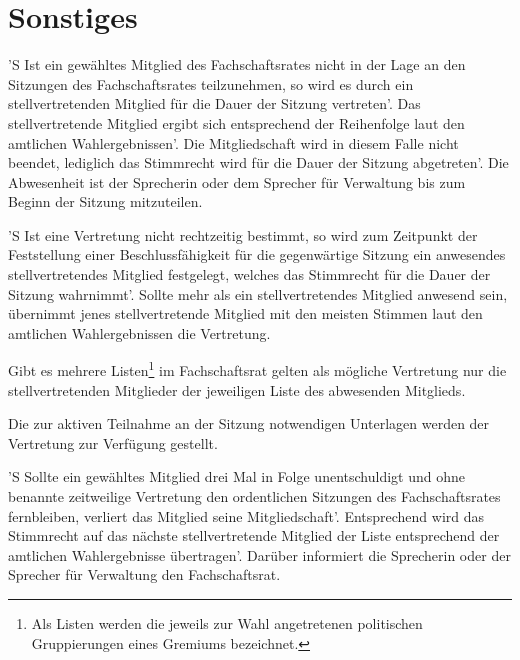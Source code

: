 \documentclass[%
	parskip=half,
]{scrartcl}
\newcommand{\edit}[1]{{\color{red} #1}}
\newcommand{\add}[1]{{\color{blue} #1}}
\begin{document}
\section{Sonstiges}

\begin{contract}


'S Ist ein gewähltes Mitglied des Fachschaftsrates nicht in der Lage an den Sitzungen des Fachschaftsrates 
teilzunehmen, so wird es durch ein stellvertretenden Mitglied für die Dauer der Sitzung vertreten'. Das 
stellvertretende Mitglied ergibt sich entsprechend der Reihenfolge laut den amtlichen Wahlergebnissen'. Die 
Mitgliedschaft wird in diesem Falle nicht beendet, lediglich das Stimmrecht wird für die Dauer der Sitzung abgetreten'. 
Die Abwesenheit ist \edit{der Sprecherin oder dem Sprecher} für Verwaltung bis zum Beginn der Sitzung mitzuteilen.

'S Ist eine Vertretung nicht rechtzeitig bestimmt, so wird zum Zeitpunkt der Feststellung \edit{einer} 
Beschlussfähigkeit \edit{für die gegenwärtige} Sitzung \edit{ein anwesendes stellvertretendes Mitglied} festgelegt, 
\edit{welches} das Stimmrecht für die Dauer der Sitzung wahrnimmt'. Sollte mehr als ein stellvertretendes Mitglied 
anwesend sein, übernimmt \edit{jenes stellvertretende} Mitglied mit den meisten Stimmen laut den amtlichen 
Wahlergebnissen die Vertretung.

Gibt es mehrere Listen\footnote{\add{Als Listen werden die jeweils zur Wahl angetretenen politischen Gruppierungen 
eines Gremiums bezeichnet.}} im Fachschaftsrat gelten als mögliche Vertretung nur die \edit{stellvertretenden 
Mitglieder} der jeweiligen Liste des abwesenden Mitglieds.

Die \edit{zur aktiven Teilnahme an der} Sitzung notwendigen Unterlagen werden der Vertretung zur Verfügung gestellt.

'S Sollte ein gewähltes Mitglied drei Mal in Folge unentschuldigt und ohne benannte zeitweilige Vertretung den 
ordentlichen Sitzungen des Fachschaftsrates fernbleiben, verliert das Mitglied seine Mitgliedschaft'. Entsprechend wird 
das Stimmrecht auf \edit{das nächste stellvertretende Mitglied der Liste entsprechend} der amtlichen Wahlergebnisse 
übertragen'. Darüber informiert \edit{die Sprecherin oder der Sprecher} für Verwaltung den Fachschaftsrat.



\end{contract}
\end{document}
